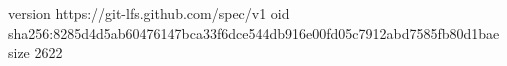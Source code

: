 version https://git-lfs.github.com/spec/v1
oid sha256:8285d4d5ab60476147bca33f6dce544db916e00fd05c7912abd7585fb80d1bae
size 2622
